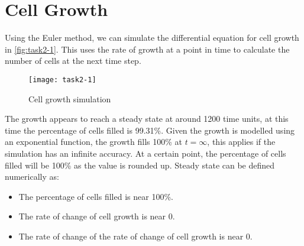\section{Cell Growth}











Using the Euler method, we can simulate the differential equation for cell growth in \autoref{fig:task2-1}.
This uses the rate of growth at a point in time to calculate the number of cells at the next time step.

\begin{figure}[ht]
    \centering
    \texttt{[image: task2-1]}
    \caption[Cell growth simulation]{Cell growth simulation}
    \label{fig:task2-1}
\end{figure}

The growth appears to reach a steady state at around 1200 time units, at this time the percentage of cells filled is 99.31\%.
Given the growth is modelled using an exponential function, the growth fills 100\% at $t = \infty$,
this applies if the simulation has an infinite accuracy.
At a certain point, the percentage of cells filled will be 100\% as the value is rounded up.
Steady state can be defined numerically as:

\begin{itemize}
    \item The percentage of cells filled is near 100\%.
    \item The rate of change of cell growth is near 0.
    \item The rate of change of the rate of change of cell growth is near 0.
\end{itemize}

